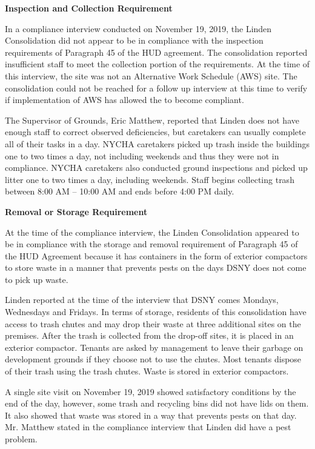 
\textbf{Inspection and Collection Requirement}

In a compliance interview conducted on November 19, 2019, the Linden Consolidation did not appear to be in compliance with the inspection requirements of Paragraph 45 of the HUD agreement. The consolidation reported insufficient staff to meet the collection portion of the requirements. At the time of this interview, the site was not an Alternative Work Schedule (AWS) site. The consolidation could not be reached for a follow up interview at this time to verify if implementation of AWS has allowed the to become compliant. 

The Supervisor of Grounds, Eric Matthew, reported that Linden does not have enough staff to correct observed deficiencies, but caretakers can usually complete all of their tasks in a day. NYCHA caretakers picked up trash inside the buildings one to two times a day, not including weekends and thus they were not in compliance. NYCHA caretakers also conducted ground inspections and picked up litter one to two times a day, including weekends. Staff begins collecting trash between 8:00 AM -- 10:00 AM and ends before 4:00 PM daily.

\textbf{Removal or Storage Requirement}

At the time of the compliance interview, the Linden Consolidation appeared to be in compliance with the storage and removal requirement of Paragraph 45 of the HUD Agreement because it has containers in the form of exterior compactors to store waste in a manner that prevents pests on the days DSNY does not come to pick up waste. 

Linden reported at the time of the interview that DSNY comes Mondays, Wednesdays and Fridays. In terms of storage, residents of this consolidation have access to trash chutes and may drop their waste at three additional sites on the premises. After the trash is collected from the drop-off sites, it is placed in an exterior compactor. Tenants are asked by management to leave their garbage on development grounds if they choose not to use the chutes. Most tenants dispose of their trash using the trash chutes. Waste is stored in exterior compactors.

A single site visit on November 19, 2019 showed satisfactory conditions by the end of the day, however, some trash and recycling bins did not have lids on them. It also showed that waste was stored in a way that prevents pests on that day. Mr. Matthew stated in the compliance interview that Linden did have a pest problem.

